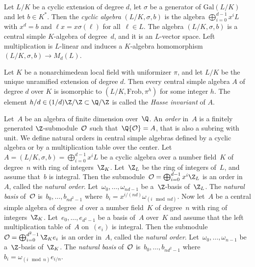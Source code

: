 \par Let $L/K$ be a cyclic extension of degree $d$, let $\sigma$ be a
generator of $\text{Gal}(L/K)$ and let $b\in K^*$. Then the \emph{cyclic
algebra} $(L/K,\sigma,b)$ is the algebra $\bigoplus_{i=0}^{d-1}x^iL$ with
$x^d=b$ and $\ell x=x\sigma(\ell)$ for all~$\ell\in L$. The algebra
$(L/K,\sigma,b)$ is a central simple $K$-algebra of degree~$d$, and it is an
$L$-vector space. Left multiplication is $L$-linear and induces a $K$-algebra
homomorphism $(L/K,\sigma,b)\to M_d(L)$.

\par Let $K$ be a nonarchimedean local field with uniformizer $\pi$, and let
$L/K$ be the unique unramified extension of degree $d$. Then every central
simple algebra $A$ of degree $d$ over $K$ is isomorphic to
$(L/K,\text{Frob},\pi^h)$ for some integer $h$. The element $h/d\in
(1/d)\Z/\Z\subset\Q/\Z$ is called the \emph{Hasse invariant} of $A$.

\par Let~$A$ be an algebra of finite dimension over~$\Q$. An \emph{order}
in~$A$ is a finitely generated $\Z$-submodule~${\cal O}$ such that~$\Q{\cal
O} = A$, that is also a subring with unit. We define natural orders in
central simple algebras defined by a cyclic algebra or by a multiplication
table over the center. Let~$A = (L/K,\sigma,b) = \bigoplus_{i=0}^{d-1}x^iL$
be a cyclic algebra over a number field~$K$ of degree~$n$ with ring of
integers~$\Z_K$. Let~$\Z_L$ be the ring of integers of~$L$, and assume
that~$b$ is integral. Then the submodule~${\cal O} =
\bigoplus_{i=0}^{d-1}x^i\Z_L$ is an order in~$A$, called the \emph{natural
order}. Let~$\omega_0,\dots,\omega_{nd-1}$ be a~$\Z$-basis of~$\Z_L$. The
\emph{natural basis} of~${\cal O}$ is~$b_0,\dots,b_{nd^2-1}$ where~$b_i =
x^{i/(nd)}\omega_{(i \mod nd)}$. Now let~$A$ be a central simple algebra of
degree~$d$ over a number field~$K$ of degree~$n$ with ring of
integers~$\Z_K$. Let~$e_0,\dots,e_{d^2-1}$ be a basis of~$A$ over~$K$ and
assume that the left multiplication table of~$A$ on~$(e_i)$ is integral. Then
the submodule~${\cal O} = \bigoplus_{i=0}^{d^2-1}\Z_K e_i$ is an order
in~$A$, called the \emph{natural order}. Let~$\omega_0,\dots,\omega_{n-1}$ be
a~$\Z$-basis of~$\Z_K$. The \emph{natural basis} of~${\cal O}$
is~$b_0,\dots,b_{nd^2-1}$ where~$b_i = \omega_{(i \mod n)}e_{i/n}$.

